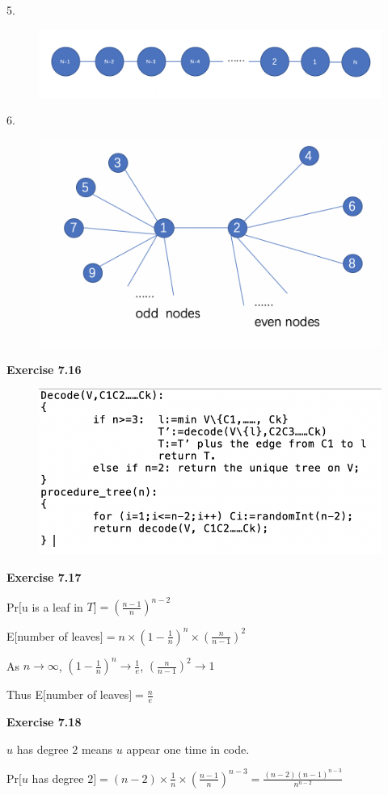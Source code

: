 \documentclass{article} %
\begin{document}
	5.\par
  	\begin{figure}[H]
  	\centering
  	\includegraphics[scale=0.6]{7155.png}
  	\caption{}
  	\label{}
  	\end{figure}
	6.\par
  	\begin{figure}[H]
  	\centering
  	\includegraphics[scale=0.6]{7156.png}
  	\caption{}
  	\label{}
  	\end{figure}
	\textbf{Exercise 7.16}\par
  	\begin{figure}[H]
  	\centering
  	\includegraphics[scale=0.8]{7161.png}
  	\caption{}
  	\label{}
  	\end{figure}
	\textbf{Exercise 7.17}\par
	Pr$[$u is a leaf in $T]=(\frac{n-1}{n})^{n-2}$\par
	E$[$number of leaves$]=n\times(1-\frac{1}{n})^{n}\times (\frac{n}{n-1})^2$\par
	As $n\rightarrow\infty$, $(1-\frac{1}{n})^{n}\rightarrow\frac{1}{e}$,  $(\frac{n}{n-1})^2\rightarrow1$\par
	Thus E$[$number of leaves$]=\frac{n}{e}$\par
	\textbf{Exercise 7.18}\par
	$u$ has degree $2$ means $u$ appear one time in code.\par
	Pr$[u$ has degree $2]=(n-2)\times\frac{1}{n}\times(\frac{n-1}{n})^{n-3}=\frac{(n-2)(n-1)^{n-3}}{n^{n-2}}$\par
\end{document}
